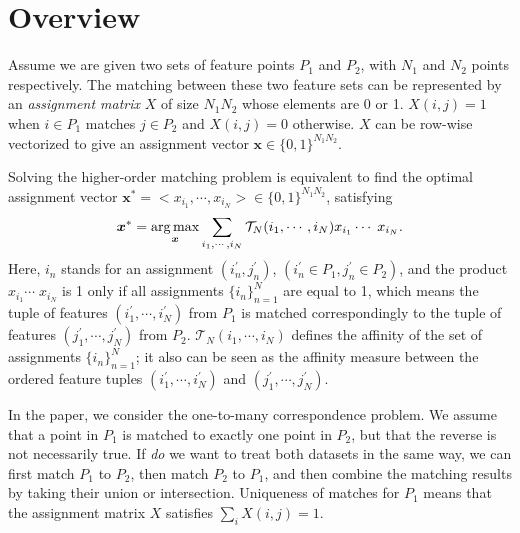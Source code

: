 \section{Overview}
\label{sec:overview}

Assume we are given two sets of feature points $P_1$ and $P_2$, with $N_1$  and $N_2$ points respectively.
The matching between these two feature sets can be represented by an \emph{assignment matrix} $X$ of size $N_1N_2$ whose elements are 0 or 1.
$X(i,j)=1$ when $i \in P_1$ matches $j \in P_2$ and $X(i,j)=0$ otherwise. $X$ can be row-wise vectorized to give an assignment vector $\boldsymbol{x} \in \{0,1\}^{N_1N_2}$.

Solving the higher-order matching problem is equivalent to find the optimal assignment vector ${\boldsymbol{x}}^*=<x_{i_1},\cdots,x_{i_N}> \in \{0,1\}^{N_1N_2}$, satisfying
\begin{equation}
\label{equ:assigment}
  {\boldsymbol{x}}^* = \operatorname*{arg\,max}_{\boldsymbol{x}}  \sum_{i_1,\cdots,i_N} \mathcal{T}_N(i_1,\cdots,i_N) x_{i_1}  \cdots\; x_{i_N}.
\end{equation}
Here, $i_n$ stands for an assignment $(i^{'}_n,j^{'}_n)$, $(i^{'}_n\in P_1,j^{'}_n\in P_2)$, and the
product $x_{i_1}  \cdots\;x_{i_N}$ is 1 only if all assignments $\{i_n\}_{n=1}^N$ are equal to 1, which means the tuple of features $(i^{'}_1,\cdots,i^{'}_N)$ from $P_1$ is matched correspondingly to the tuple of features $(j^{'}_1,\cdots,j^{'}_N)$ from $P_2$.
$\mathcal{T}_N(i_1,\cdots,i_N)$ defines the affinity of the set of assignments $\{i_n\}_{n=1}^N$;
it also can be seen as the affinity measure between the ordered feature tuples $(i^{'}_1,\cdots,i^{'}_N)$  and $(j^{'}_1,\cdots,j^{'}_N)$.

In the paper, we consider the one-to-many correspondence problem.
We assume that a point in $P_1$ is matched to exactly one point in $P_2$, but that the reverse is not necessarily true.
If \emph{do} we want to treat both datasets in the same way,
we can first match $P_1$ to $P_2$, then match $P_2$ to $P_1$, and then combine the matching results by taking their union or intersection.
Uniqueness of matches for $P_1$ means that the assignment matrix $X$ satisfies $\sum\nolimits_i X(i,j)=1$.

